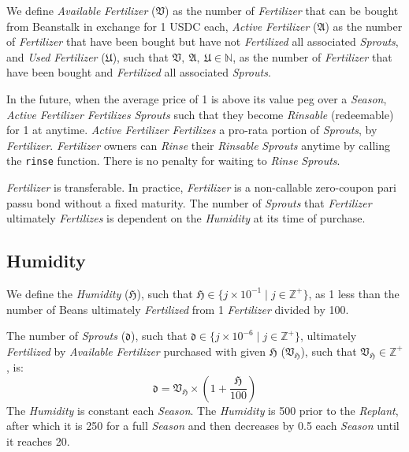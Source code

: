 \documentclass[tikz]{article}
\newcommand{\code}[1]{\texttt{#1}}
\newcommand{\term}[1]{\textsl{#1}}
\newcommand{\Bean}{} %
\begin{document}
We define \term{Available} \term{Fertilizer} ($\mathfrak{V}$) as the number of \term{Fertilizer} that can be bought from Beanstalk in exchange for 1 USDC each, \term{Active} \term{Fertilizer} ($\mathfrak{A}$) as the number of \term{Fertilizer} that have been bought but have not \term{Fertilized} all associated \term{Sprouts}, and \term{Used} \term{Fertilizer} ($\mathfrak{U}$), such that $\mathfrak{V},\ \mathfrak{A},\ \mathfrak{U} \in \mathbb{N}$, as the number of \term{Fertilizer} that have been bought and \term{Fertilized} all associated \term{Sprouts}. 

In the future, when the average price of \Bean1 is above its value peg over a \term{Season}, \term{Active} \term{Fertilizer} \term{Fertilizes} \term{Sprouts} such that they become \term{Rinsable} (redeemable) for \Bean1 at anytime. \term{Active} \term{Fertilizer} \term{Fertilizes} a pro-rata portion of \term{Sprouts}, by \term{Fertilizer}. \term{Fertilizer} owners can \term{Rinse} their \term{Rinsable} \term{Sprouts} anytime by calling the \code{rinse} function. There is no penalty for waiting to \term{Rinse} \term{Sprouts}.

\term{Fertilizer} is transferable. In practice, \term{Fertilizer} is a non-callable zero-coupon pari passu bond without a fixed maturity. The number of \term{Sprouts} that \term{Fertilizer} ultimately \term{Fertilizes} is dependent on the \term{Humidity} at its time of purchase.

\subsection{Humidity}
We define the \term{Humidity} ($\mathfrak{H}$), such that $\mathfrak{H} \in \{j \times 10^{-1} \mid j \in \mathbb{Z}^{+} \}$, as 1 less than the number of Beans ultimately \term{Fertilized} from 1 \term{Fertilizer} divided by 100. 

The number of \term{Sprouts} ($\mathfrak{d}$), such that $\mathfrak{d} \in \{j \times 10^{-6} \mid j \in \mathbb{Z}^{+} \}$, ultimately \term{Fertilized} by \term{Available} \term{Fertilizer} purchased with given $\mathfrak{H}$ ($\mathfrak{V}_\mathfrak{H}$), such that $\mathfrak{V}_\mathfrak{H} \in \mathbb{Z}^{+}$, is:
$$\mathfrak{d} = \mathfrak{V}_\mathfrak{H} \times \left(1 + \frac{\mathfrak{H}}{100}\right)$$
The \term{Humidity} is constant each \term{Season}. The \term{Humidity} is 500 prior to the \term{Replant}, after which it is 250 for a full \term{Season} and then decreases by 0.5 each \term{Season} until it reaches 20.
\end{document}
